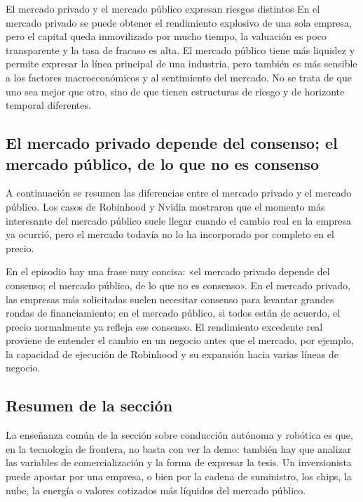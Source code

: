 \begin{warningbox}{El mercado privado y el mercado público expresan riesgos distintos}
En el mercado privado se puede obtener el rendimiento explosivo de una sola empresa, pero el capital queda inmovilizado por mucho tiempo, la valuación es poco transparente y la tasa de fracaso es alta. El mercado público tiene más liquidez y permite expresar la línea principal de una industria, pero también es más sensible a los factores macroeconómicos y al sentimiento del mercado. No se trata de que uno sea mejor que otro, sino de que tienen estructuras de riesgo y de horizonte temporal diferentes.
\end{warningbox}

\subsection{El mercado privado depende del consenso; el mercado público, de lo que no es consenso}

A continuación se resumen las diferencias entre el mercado privado y el mercado público. Los casos de Robinhood y Nvidia mostraron que el momento más interesante del mercado público suele llegar cuando el cambio real en la empresa ya ocurrió, pero el mercado todavía no lo ha incorporado por completo en el precio.

En el episodio hay una frase muy concisa: «el mercado privado depende del consenso; el mercado público, de lo que no es consenso». En el mercado privado, las empresas más solicitadas suelen necesitar consenso para levantar grandes rondas de financiamiento; en el mercado público, si todos están de acuerdo, el precio normalmente ya refleja ese consenso. El rendimiento excedente real proviene de entender el cambio en un negocio antes que el mercado, por ejemplo, la capacidad de ejecución de Robinhood y su expansión hacia varias líneas de negocio.

\subsection{Resumen de la sección}

La enseñanza común de la sección sobre conducción autónoma y robótica es que, en la tecnología de frontera, no basta con ver la demo: también hay que analizar las variables de comercialización y la forma de expresar la tesis. Un inversionista puede apostar por una empresa, o bien por la cadena de suministro, los chips, la nube, la energía o valores cotizados más líquidos del mercado público.
